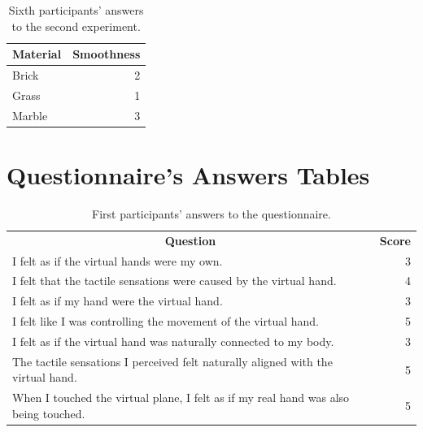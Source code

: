 \documentclass[uplatex,
12pt, %
a4paper,
english, %
oneside,
titlepage,
singlespacing, %
liststotoc, %
headsepline,
]{MastersDoctoralThesis} %
\begin{document}
\begin{appendices}
\begin{table}[H]
  \centering
  \caption{Sixth participants' answers to the second experiment.}
    \begin{tabular}{|l|r|}
    \toprule
    \textbf{Material} & \multicolumn{1}{l|}{\textbf{Smoothness}} \\
    \midrule
    Brick & 2 \\
    \midrule
    Grass & 1 \\
    \midrule
    Marble & 3 \\
    \bottomrule
    \end{tabular}%
  \label{tab:Ex2_6}%
\end{table}%

\chapter{Questionnaire's Answers Tables}
\label{appendix:c}
\begin{table}[H]
  \centering
  \caption{First participants' answers to the questionnaire.}
    \begin{tabular}{|lrrrrrrrr|r|}
    \toprule
    \multicolumn{9}{c|}{\multirow{2}[2]{*}{\textbf{Question}}}            & \multicolumn{1}{c|}{\multirow{2}[2]{*}{\textbf{Score}}} \\
    \multicolumn{9}{c|}{}                                                 &  \\
    \midrule
    \multicolumn{9}{|l|}{I felt as if the virtual hands were my own.}     & 3 \\
    \midrule
    \multicolumn{9}{|l|}{I felt that the tactile sensations were caused by the virtual hand.} & 4 \\
    \midrule
    \multicolumn{9}{|l|}{I felt as if my hand were the virtual hand.}     & 3 \\
    \midrule
    \multicolumn{9}{|l|}{I felt like I was controlling the movement of the virtual hand.} & 5 \\
    \midrule
    \multicolumn{9}{|l|}{I felt as if the virtual hand was naturally connected to my body.} & 3 \\
    \midrule
    \multicolumn{9}{|l|}{The tactile sensations I perceived felt naturally aligned with the virtual hand.} & 5 \\
    \midrule
    \multicolumn{9}{|l|}{When I touched the virtual plane, I felt as if my real hand was also being touched.} & 5 \\

\end{tabular}
\end{table}
\end{appendices}
\end{document}
